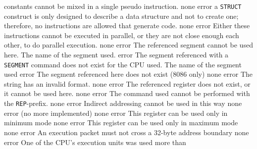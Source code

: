 \documentclass[12pt,twoside]{report}
\newcommand{\tty}[1]{{\tt #1}}
\begin{document}
\begin{description}
{                constants cannot be mixed in a single pseudo instruction.}
               {none}
               {error}
               {a \tty{STRUCT} construct is only designed to describe a
                data structure and not to create one; therefore, no
                instructions are allowed that generate code.}
               {none}
               {error}
               {Either these instructions cannot be executed in parallel,
                or they are not close enough each other, to do parallel
                execution.}
               {none}
               {error}
               {The referenced segment cannot be used here.}
               {The name of the segment used.}
               {error}
               {The segment referenced with a \tty{SEGMENT} command does not
                exist for the CPU used.}
               {The name of the segment used}
               {error}
               {The segment referenced here does not exist (8086 only)}
               {none}
               {error}
               {The string has an invalid format.}
               {none}
               {error}
               {The referenced register does not exist, or it cannot
                be used here.}
               {none}
               {error}
               {The command used cannot be performed with the \tty{REP}-prefix.}
               {none}
               {error}
               {Indirect addressing cannot be used in this way}
               {none}
               {error}
               {(no more implemented)}
               {none}
               {error}
               {This register can be used only in minimum mode}
               {none}
               {error}
               {This register can be used only in maximum mode}
               {none}
               {error}
               {An execution packet must not cross a 32-byte address
                boundary}
               {none}
               {error}
               {One of the CPU's execution units was used more than
}
\end{description}
\end{document}
